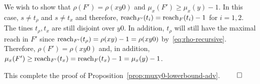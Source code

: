     We wish to show that 
    $\rho(F') = \rho(xy0)$ and 
    $\mu_x(F') \geq \mu_x(y) - 1$.
    In this case, $s \neq t_\rho$ and $s \neq t_x$ and therefore, 
    $\operatorname{reach}_{F'}(t_i)=\operatorname{reach}_{F}(t_i)-1$ for $i = {1,2}$. 
    The tines $t_\rho, t_x$ are still disjoint over $y0$. 
    In addition, $t_\rho$ will still have the maximal reach in $F'$ 
    since $\operatorname{reach}_{F'}(t_\rho) = \rho(xy) - 1 = \rho(xy0)$ by~\ref{eq:rho-recursive}. 
    Therefore, 
    $\rho(F') = \rho(xy0)$ and, in addition, 
    $\mu_x(F') \geq \operatorname{reach}_{F'}(t_x) = \operatorname{reach}_{F}(t_x) - 1 = \mu_x(y)-1$.


  This complete the proof of Proposition~\ref{prop:muxy0-lowerbound-adv}.
  \hfill $\qed$











